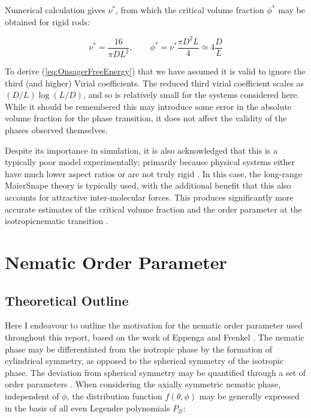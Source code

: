 \documentclass[11pt, a4paper]{article} %
\begin{document}
\begin{appendices}
Numerical calculation gives $\nu^{*}$, from which the critical volume fraction $\phi^{*}$ may be obtained for rigid rods:

\begin{equation}
\nu^{*} = \frac{16}{\pi D L^{2}}, \qquad \phi^{*} = \nu^{*} \frac{\pi D^{2} L}{4} \simeq 4 \frac{D}{L}
\end{equation}


To derive (\ref{eq:OnsagerFreeEnergy}) that we have assumed it is valid to ignore the third (and higher) Virial coefficients. The reduced third virial coefficient scales as $(D/L)\log(L/D)$, and so is relatively small for the systems considered here. While it should be remembered this may introduce some error in the absolute volume fraction for the phase transition, it does not affect the validity of the phases observed themselves.

Despite its importance in simulation, it is also acknowledged that this is a typically poor model experimentally; primarily because physical systems either have much lower aspect ratios or are not truly rigid \cite{Odijk1985}. In this case, the long-range Maier\textendash Snape theory \cite{Maier1959} is typically used, with the additional benefit that this also accounts for attractive inter-molecular forces. This produces significantly more accurate estimates of the critical volume fraction and the order parameter at the isotropic\textendash nematic transition \cite{Zannoni1979b}.

\section{Nematic Order Parameter} 
\subsection{Theoretical Outline}\label{sec:OrderParamTheory}
Here I endeavour to outline the motivation for the nematic order parameter used throughout this report, based on the work of Eppenga and Frenkel \cite{Eppenga1984, Frenkel1982}. The nematic phase may be differentiated from the isotropic phase by the formation of cylindrical symmetry, as opposed to the spherical symmetry of the isotropic phase. The deviation from spherical symmetry may be quantified through a set of order parameters \cite{Zannoni1979}. When considering the axially symmetric nematic phase, independent of $\phi$, the distribution function $f(\theta, \phi)$ may be generally expressed in the basis of all even Legendre polynomials $P_{2l}$:


\end{appendices}
\end{document}
